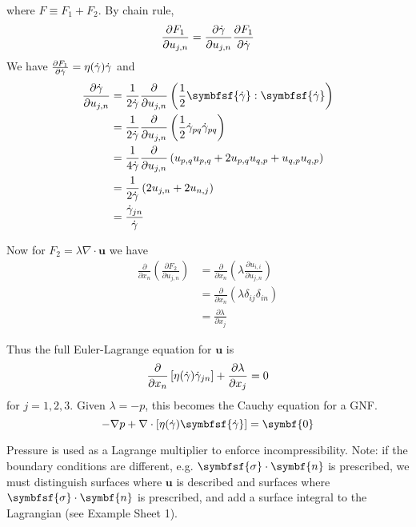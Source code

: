\documentclass{jknotes}
\begin{document}
where $F \equiv F_1 + F_2$. By chain rule, 
\begin{equation}
	\frac{\partial F_1}{\partial u_{j,n}} = \frac{\partial \dot{\gamma}}{\partial
	u_{j,n}} \frac{\partial F_1}{\partial \dot{\gamma}}
\end{equation}
We have $\frac{\partial F_1}{\partial \dot{\gamma}} = \eta(\dot{\gamma}) \dot{\gamma}$ and
\begin{align}
	\frac{\partial \srate}{\partial u_{j,n}} &=
	\frac{1}{2\srate} \frac{\partial}{\partial u_{j,n}} \left( \frac{1}{2}
	\symbfsf{\srate}:\symbfsf{\srate}\right) \\
	&= \frac{1}{2\srate} \frac{\partial}{\partial u_{j,n}} \left( \frac{1}{2}
	\srate_{pq} \srate_{pq}\right) \\
	&= \frac{1}{4\srate} \frac{\partial}{\partial u_{j,n}}\left(
u_{p,q}u_{p,q} + 2u_{p,q}u_{q,p} + u_{q,p}u_{q,p}\right) \\
&= \frac{1}{2\srate} \left( 2 u_{j,n} + 2u_{n,j}\right) \\
&= \frac{\srate_{jn}}{\srate}
\end{align}

Now for $F_2 = \lambda \nabla \cdot \symbf{u}$ we have
\begin{align}
	\frac{\partial}{\partial x_n} \left( \frac{\partial F_2}{\partial u_{j,n}}
		\right) &= \frac{\partial}{\partial x_n} \left( \lambda
		\frac{\partial u_{i,i}}{\partial u_{j,n}}
	\right) \\
	&= \frac{\partial}{\partial x_n} \left( \lambda \delta_{ij}
\delta_{in}\right) \\
&= \frac{\partial \lambda}{\partial x_j}
\end{align}

Thus the full Euler-Lagrange equation for $\symbf{u}$ is
\begin{equation}
	\frac{\partial}{\partial x_n} \left[ \eta(\dot{\gamma}) \dot{\gamma}_{jn}\right] +
	\frac{\partial \lambda}{\partial x_j} = 0
\end{equation}
for $j= 1, 2, 3$. Given $\lambda = -p$, this becomes the Cauchy equation for a
GNF.
\begin{equation}
	-\nabla p + \nabla \cdot \left[ \eta(\srate) \symbfsf{\srate}\right] =
	\symbf{0}
\end{equation}

Pressure is used as a Lagrange multiplier to enforce incompressibility. Note:
if the boundary conditions are different, e.g. $\symbfsf{\sigma} \cdot \symbf{n}$
is prescribed, we must distinguish surfaces where $\symbf{u}$ is described and
surfaces where $\symbfsf{\sigma} \cdot \symbf{n}$ is prescribed, and add a surface
integral to the Lagrangian (see Example Sheet 1).
\end{document}
